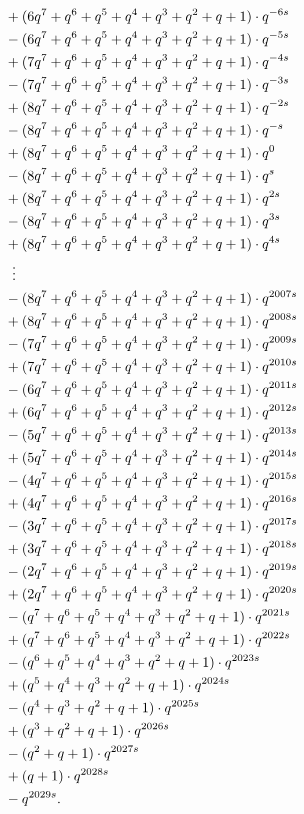\begin{example}
\begin{align*}
    &+ (6q^7+q^6+q^5+q^4+q^3+q^2+q+1) \cdot q^{-6s} \\
    &- (6q^7+q^6+q^5+q^4+q^3+q^2+q+1) \cdot q^{-5s} \\
    &+ (7q^7+q^6+q^5+q^4+q^3+q^2+q+1) \cdot q^{-4s} \\
    &- (7q^7+q^6+q^5+q^4+q^3+q^2+q+1) \cdot q^{-3s} \\
    &+ (8q^7+q^6+q^5+q^4+q^3+q^2+q+1) \cdot q^{-2s} \\
    &- (8q^7+q^6+q^5+q^4+q^3+q^2+q+1) \cdot q^{-s} \\
    &+ (8q^7+q^6+q^5+q^4+q^3+q^2+q+1) \cdot q^{0} \\
    &- (8q^7+q^6+q^5+q^4+q^3+q^2+q+1) \cdot q^{s} \\
    &+ (8q^7+q^6+q^5+q^4+q^3+q^2+q+1) \cdot q^{2s} \\
    &- (8q^7+q^6+q^5+q^4+q^3+q^2+q+1) \cdot q^{3s} \\
    &+ (8q^7+q^6+q^5+q^4+q^3+q^2+q+1) \cdot q^{4s} \\
    &\vdotswithin= \\
    &- (8q^7+q^6+q^5+q^4+q^3+q^2+q+1) \cdot q^{2007s} \\
    &+ (8q^7+q^6+q^5+q^4+q^3+q^2+q+1) \cdot q^{2008s} \\
    &- (7q^7+q^6+q^5+q^4+q^3+q^2+q+1) \cdot q^{2009s} \\
    &+ (7q^7+q^6+q^5+q^4+q^3+q^2+q+1) \cdot q^{2010s} \\
    &- (6q^7+q^6+q^5+q^4+q^3+q^2+q+1) \cdot q^{2011s} \\
    &+ (6q^7+q^6+q^5+q^4+q^3+q^2+q+1) \cdot q^{2012s} \\
    &- (5q^7+q^6+q^5+q^4+q^3+q^2+q+1) \cdot q^{2013s} \\
    &+ (5q^7+q^6+q^5+q^4+q^3+q^2+q+1) \cdot q^{2014s} \\
    &- (4q^7+q^6+q^5+q^4+q^3+q^2+q+1) \cdot q^{2015s} \\
    &+ (4q^7+q^6+q^5+q^4+q^3+q^2+q+1) \cdot q^{2016s} \\
    &- (3q^7+q^6+q^5+q^4+q^3+q^2+q+1) \cdot q^{2017s} \\
    &+ (3q^7+q^6+q^5+q^4+q^3+q^2+q+1) \cdot q^{2018s} \\
    &- (2q^7+q^6+q^5+q^4+q^3+q^2+q+1) \cdot q^{2019s} \\
    &+ (2q^7+q^6+q^5+q^4+q^3+q^2+q+1) \cdot q^{2020s} \\
    &- (q^7+q^6+q^5+q^4+q^3+q^2+q+1) \cdot q^{2021s} \\
    &+ (q^7+q^6+q^5+q^4+q^3+q^2+q+1) \cdot q^{2022s} \\
    &- (q^6+q^5+q^4+q^3+q^2+q+1) \cdot q^{2023s} \\
    &+ (q^5+q^4+q^3+q^2+q+1) \cdot q^{2024s} \\
    &- (q^4+q^3+q^2+q+1) \cdot q^{2025s} \\
    &+ (q^3+q^2+q+1) \cdot q^{2026s} \\
    &- (q^2+q+1) \cdot q^{2027s} \\
    &+ (q+1) \cdot q^{2028s} \\
    &- q^{2029s}.
  \end{align*}
\end{example}
